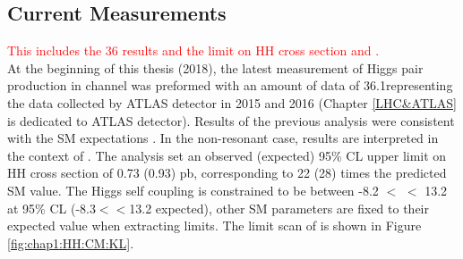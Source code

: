 \subsection{Current Measurements}
\label{chap1:HH:CM}
\textcolor{red}{This includes the 36 \ifb results and the limit on HH cross section and \kl.} \\
At the beginning of this thesis (2018), the latest measurement of Higgs pair production in \HHyybb channel was preformed with an amount of data of 36.1\ifb representing the data collected by ATLAS detector in 2015 and 2016 (Chapter \ref{LHC&ATLAS} is dedicated to ATLAS detector). Results of the previous analysis were consistent with the SM expectations \cite{yybb_36ifb}. In the non-resonant case, results are interpreted in the context of \kl. The analysis set an observed (expected) 95\% CL upper limit on HH cross section of 0.73 (0.93) pb, corresponding to 22 (28) times the predicted SM value. The Higgs self coupling is constrained to be between -8.2 $<$ \kl $<$ 13.2 at 95\% CL (-8.3$<$\kl$<$13.2 expected), other SM parameters are fixed to their expected value when extracting limits. The limit scan of \kl is shown in Figure \ref{fig:chap1:HH:CM:KL}. \\

